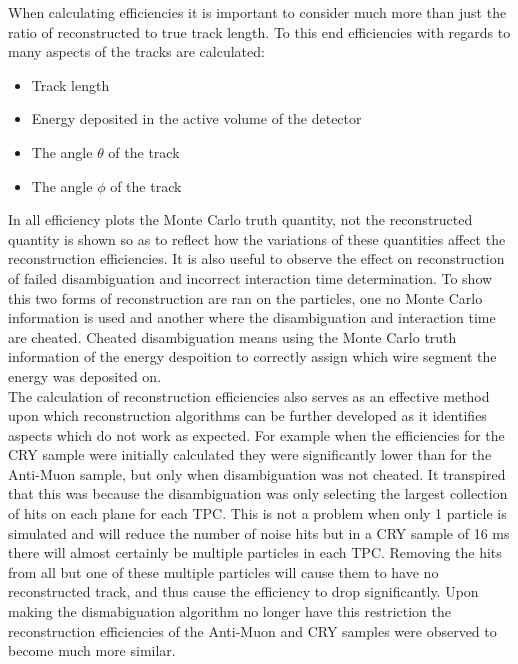 When calculating efficiencies it is important to consider much more than just the ratio of reconstructed to true track length. To this end efficiencies with regards to many aspects of the tracks are calculated:
\begin{itemize}
\item Track length
\item Energy deposited in the active volume of the detector
\item The angle $\theta$ of the track
\item The angle $\phi$ of the track
\end{itemize}
In all efficiency plots the Monte Carlo truth quantity, not the reconstructed quantity is shown so as to reflect how the variations of these quantities affect the reconstruction efficiencies. It is also useful to observe the effect on reconstruction of failed disambiguation and incorrect interaction time determination. To show this two forms of reconstruction are ran on the particles, one no Monte Carlo information is used and another where the disambiguation and interaction time are cheated. Cheated disambiguation means using the Monte Carlo truth information of the energy despoition to correctly assign which wire segment the energy was deposited on. \\

The calculation of reconstruction efficiencies also serves as an effective method upon which reconstruction algorithms can be further developed as it identifies aspects which do not work as expected. For example when the efficiencies for the CRY sample were initially calculated they were significantly lower than for the Anti-Muon sample, but only when disambiguation was not cheated. It transpired that this was because the disambiguation was only selecting the largest collection of hits on each plane for each TPC. This is not a problem when only 1 particle is simulated and will reduce the number of noise hits but in a CRY sample of 16 ms there will almost certainly be multiple particles in each TPC. Removing the hits from all but one of these multiple particles will cause them to have no reconstructed track, and thus cause the efficiency to drop significantly. Upon making the dismabiguation algorithm no longer have this restriction the reconstruction efficiencies of the Anti-Muon and CRY samples were observed to become much more similar. \\


